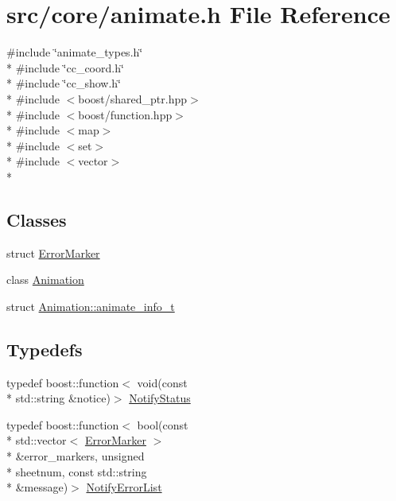 \hypertarget{a00195}{\section{src/core/animate.h File Reference}
\label{a00195}
}
{\ttfamily \#include \char`\"{}animate\-\_\-types.\-h\char`\"{}}\\*
{\ttfamily \#include \char`\"{}cc\-\_\-coord.\-h\char`\"{}}\\*
{\ttfamily \#include \char`\"{}cc\-\_\-show.\-h\char`\"{}}\\*
{\ttfamily \#include $<$boost/shared\-\_\-ptr.\-hpp$>$}\\*
{\ttfamily \#include $<$boost/function.\-hpp$>$}\\*
{\ttfamily \#include $<$map$>$}\\*
{\ttfamily \#include $<$set$>$}\\*
{\ttfamily \#include $<$vector$>$}\\*
\subsection*{Classes}
\begin{DoxyCompactItemize}
\item 
struct \hyperlink{a00098}{Error\-Marker}
\item 
class \hyperlink{a00010}{Animation}
\item 
struct \hyperlink{a00002}{Animation\-::animate\-\_\-info\-\_\-t}
\end{DoxyCompactItemize}
\subsection*{Typedefs}
\begin{DoxyCompactItemize}
\item 
typedef boost\-::function$<$ void(const \\*
std\-::string \&notice)$>$ \hyperlink{a00195_aef08fe65401b34c561d7d6fc0ff39b60}{Notify\-Status}
\item 
typedef boost\-::function$<$ bool(const \\*
std\-::vector$<$ \hyperlink{a00098}{Error\-Marker} $>$\\*
 \&error\-\_\-markers, unsigned \\*
sheetnum, const std\-::string \\*
\&message)$>$ \hyperlink{a00195_a9f9c725e3e1c76c65ddb676bf591d49b}{Notify\-Error\-List}
\end{DoxyCompactItemize}

